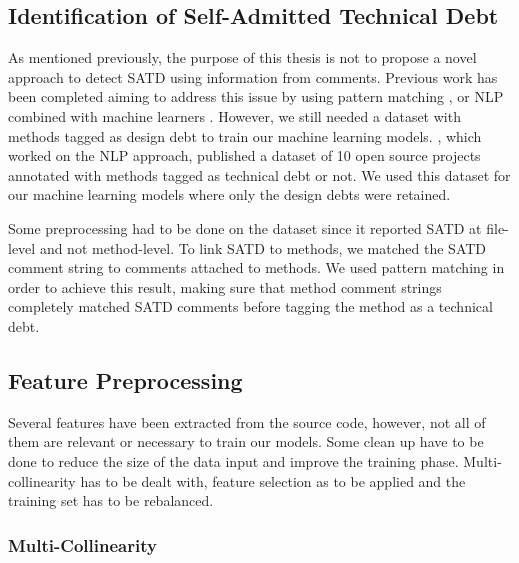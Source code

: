 \subsection{Identification of Self-Admitted Technical Debt}


As mentioned previously, the purpose of this thesis is not to propose a novel approach to detect \ac{SATD} using information from comments. Previous work has been completed aiming to address this issue by using pattern matching \citep{MaldonadoS15}, \citep{PotdarS14} or \ac{NLP} combined with machine learners \citep{maldonado17}. However, we still needed a dataset with methods tagged as design debt to train our machine learning models. \citet{maldonado17}, which worked on the \ac{NLP} approach, published a dataset of 10 open source projects annotated with methods tagged as technical debt or not. We used this dataset for our machine learning models where only the design debts were retained. \par

Some preprocessing had to be done on the dataset since it reported \ac{SATD} at file-level and not method-level. To link \ac{SATD} to methods, we matched the \ac{SATD} comment string to comments attached to methods. We used pattern matching in order to achieve this result, making sure that method comment strings completely matched \ac{SATD} comments before tagging the method as a technical debt.

\subsection{Feature Preprocessing}


Several features have been extracted from the source code, however, not all of them are relevant or necessary to train our models. Some clean up have to be done to reduce the size of the data input and improve the training phase. Multi-collinearity has to be dealt with, feature selection as to be applied and the training set has to be rebalanced.

\subsubsection{Multi-Collinearity}


